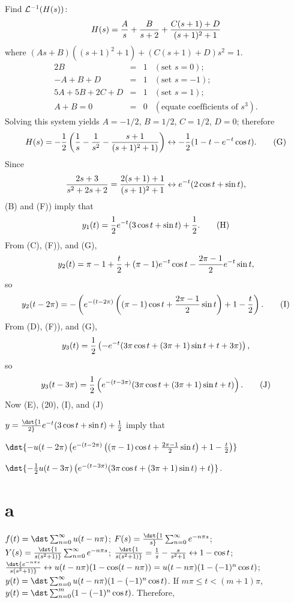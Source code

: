 \documentclass[dvips]{book}
\renewcommand{\exer}[1]{\par\medskip\;\noindent{\color{red}\bf #1.}}
\numberwithin{example}{section}
\numberwithin{equation}{section}
\numberwithin{theorem}{section}
\numberwithin{table}{section}
\numberwithin{figure}{section}
\begin{document}
Find ${\cal L}^{-1}(H(s))$:
$$
H(s)={A\over s}+{B\over s+2}+{C(s+1)+D\over(s+1)^2+1}
$$
where
$(As+B)((s+1)^2+1)+(C(s+1)+D)s^2=1$.
$$
\begin{array}{rcrl}
2B&=&1&(\mbox{set }s=0);\\
-A+B+D&=&1& (\mbox{set }s=-1);\\
5A+5B+2C+D&=&1& (\mbox{set }s=1);\\
A+B=0&=&0&(\mbox{equate coefficients of }s^3).
\end{array}
$$
Solving this system yields  $A=-1/2$, $B=1/2$, $C=1/2$, $D=0$;
therefore
\begin{equation}
H(s)=-{1\over2}\left({1\over
s}-{1\over s^2}-{s+1\over(s+1)^2+1)}\right)
\leftrightarrow -{1\over2}(1-t-e^{-t}\cos t). \tag{G}
\end{equation}
Since
$$
{2s+3\over s^2+2s+2}={2(s+1)+1\over(s+1)^2+1}
\leftrightarrow e^{-t}(2\cos t+\sin t),
$$
(B) and (F)) imply that
\begin{equation}
y_1(t)={1\over2}e^{-t}(3\cos t+\sin t)+{1\over2}.
\tag{H}
\end{equation}
From (C), (F)), and (G),
$$
y_2(t)=\pi-1+{t\over2}+(\pi-1) e^{-t}\cos t-{2\pi-1\over2}e^{-t}\sin
t,
$$
so
\begin{equation}
y_2(t-2\pi)=-\left(
e^{-(t-2\pi)}\left((\pi-1)\cos t+{2\pi-1\over2}\sin t\right)+
1-{t\over2}\right). \tag{I}
\end{equation}
From (D), (F)), and (G),
$$
y_3(t)={1\over2}\left(-e^{-t}(3\pi\cos t+(3\pi+1)\sin
t+t+3\pi)\right),
$$
so
\begin{equation}
y_3(t-3\pi)={1\over2}\left(e^{-(t-3\pi)}(3\pi\cos t+(3\pi+1)\sin
t+t)\right).  \tag{J}
\end{equation}
Now (E), (20), (I), and
(J)

$y=\dst{1\over2}e^{-t}(3\cos t+\sin t)+{1\over2}$ imply that

$\dst{-u(t-2\pi)\left(
e^{-(t-2\pi)}\left((\pi-1)\cos t+{2\pi-1\over2}\sin t\right)+
1-{t\over2}\right)}$

$\dst{-{1\over2}u(t-3\pi)\left(e^{-(t-3\pi)}(3\pi\cos
t+(3\pi+1)\sin t
)+t\right)}$.



\exer{8.5.22}
\part{a}
$f(t)=\dst\sum_{n=0}^\infty u(t-n\pi)$; $F(s)=\dst{1\over
s}\sum_{n=0}^\infty e^{-n\pi s}$; $Y(s)=\dst{1\over
s(s^2+1)}\sum_{n=0}^\infty e^{-n\pi s}$;
 $\dst{1\over s(s^2+1)}={1\over s}-{s\over s^2+1}
\leftrightarrow 1-\cos t$;
 $\dst{e^{-n\pi s}\over s(s^2+1)}\leftrightarrow
u(t-n\pi)(1-\cos(t-n\pi))=u(t-n\pi)(1-(-1)^n\cos t)$;
$y(t)=\dst
\sum_{n=0}^\infty u(t-n\pi)(1-(-1)^n\cos t)$. If $m\pi\le t<(m+1)\pi$,
$y(t)=\dst
\sum_{n=0}^m (1-(-1)^n\cos t)$. Therefore,
\end{document}

